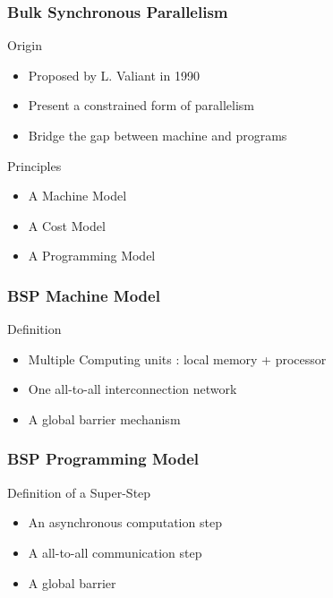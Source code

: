 \frame
{
  \frametitle{Bulk Synchronous Parallelism}
  \begin{block}{Origin}
  \begin{itemize}
  \footnotesize
  \item Proposed by L. Valiant in 1990
  \item Present a constrained form of parallelism
  \item Bridge the gap between machine and programs
 \end{itemize}
  \end{block}{}

  \begin{block}{Principles}
  \begin{itemize}
  \footnotesize
  \item A Machine Model
  \item A Cost Model
  \item A Programming Model
 \end{itemize}
  \end{block}{}
}

\frame
{
  \frametitle{BSP Machine Model}
  \begin{center}\end{center}

  \begin{block}{Definition}
  \begin{itemize}
  \footnotesize
  \item Multiple Computing units : local memory + processor
  \item One all-to-all interconnection network
  \item A global barrier mechanism
 \end{itemize}
  \end{block}{}
}

\frame
{
  \frametitle{BSP Programming Model}
  \begin{center}\end{center}

  \begin{block}{Definition of a Super-Step}
  \begin{itemize}
  \footnotesize
  \item An asynchronous computation step
  \item A all-to-all communication step
  \item A global barrier
 \end{itemize}
  \end{block}{}
}




